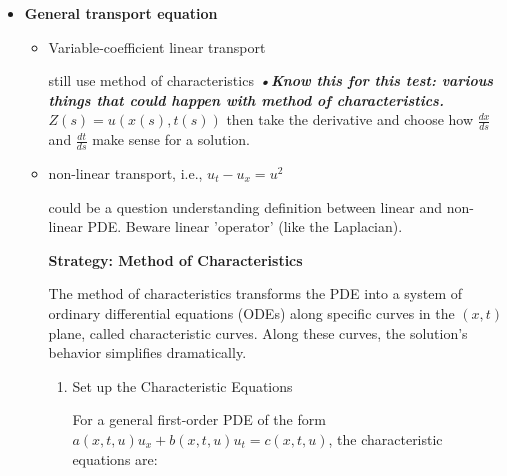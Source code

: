 \documentclass[12pt,a4paper]{report}
\begin{document}
{\begin{description}
\begin{itemize}
\begin{itemize}
	\item Three dimensional wave propagation continues past the point.
	
	\item Two dimensional case use method of descent.  End up with a cumbersom formula.
	
\end{itemize}		
	
	\textbf{Huygen's Principle} is the difference between 2-dimensional and 3-dimensional wave propogation.
	
	\textbf{Energy Methods} Prove:
	\begin{itemize}
		\item unique
		\item no maximum principle
		\item alternate proof of finite speed of popagation (doesn't use Kirchoff's formula).
	\end{itemize}
		
	\item \textbf{General transport equation}
	\begin{itemize}
		\item Variable-coefficient linear transport
		
		still use method of characteristics \textbf{\textit{•Know this for this test: various things that could happen with method of characteristics.}} $Z(s)=u(x(s), t(s))$ then take the derivative and choose how $\frac{dx}{ds}$ and $\frac{dt}{ds}$ make sense for a solution.
		
		\item non-linear transport, i.e., $u_t-u_x=u^2$
		
		could be a question understanding definition between linear and non-linear PDE.  Beware linear 'operator' (like the Laplacian).
		

\textbf{Strategy: Method of Characteristics}

The method of characteristics transforms the PDE into a system of ordinary differential equations (ODEs) along specific curves in the \((x,t)\) plane, called characteristic curves. Along these curves, the solution's behavior simplifies dramatically.
\begin{enumerate}

\item  Set up the Characteristic Equations

For a general first-order PDE of the form \(a(x,t,u)u_x + b(x,t,u)u_t = c(x,t,u)\), the characteristic equations are:


\end{enumerate}
\end{itemize}
\end{itemize}
\end{description}}
\end{document}
